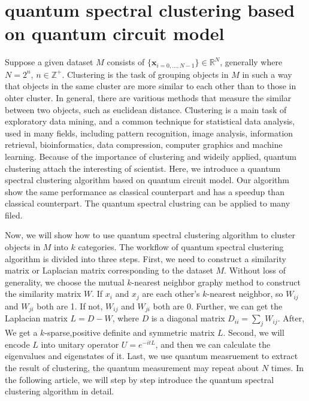 \documentclass[twocolumn,notitlepage]{revtex4-1}
\def\vec#1{{\bm #1}}
\begin{document}
\section{quantum spectral clustering based on quantum circuit model}
Suppose a given dataset $M$ consists of $\{\vec{x}_{i=0,\ldots,N-1}\}\in \mathbb{R}^{N}$, generally where $N=2^{n}$, $n \in \mathbb{Z}^{+}$.
Clustering is the task of grouping objects in $M$ in such a way that objects in the same cluster are more similar to each other than to those in ohter cluster.
In general, there are varitious methods that measure the similar between two objects, such as euclidean distance. 
Clustering is a main task of exploratory data mining, and a common technique for statistical data analysis, used in many fields, including pattern recognition, image analysis, information retrieval, bioinformatics, data compression, computer graphics and machine learning. 
Because of the importance of clustering and wideily applied, quantum clustering attach the interesting of scientist. 
Here, we introduce a quantum spectral clustering algorithm based on quantum circuit model. 
Our algorithm show the same performance as classical counterpart and has a speedup than classical counterpart. 
The quantum spectral clustring can be applied to many filed.

Now, we will show how to use quantum spectral clustering algorithm to cluster objects in $M$ into $k$ categories.
The workflow of quantum spectral clustering algorithm is divided into three steps. 
First, we need to construct a similarity matrix or Laplacian matrix corresponding to the dataset $M$. Without loss of generality, we choose the mutual $k$-nearest neighbor graphy method to construct the similarity matrix $W$.
If $x_i$ and $x_j$ are each other's $k$-nearest neighbor, so $W_{ij}$ and $W_{ji}$ both are 1. 
If not, $W_{ij}$ and $W_{ji}$ both are 0. 
Further, we can get the Laplacian matrix $L=D-W$, where $D$ is a diagonal matrix $D_{ii}=\sum_{j}W_{ij}$. After, We get a $k$-sparse,positive definite and symmetric matrix $L$.
Second, we will encode $L$ into unitary operator $U=e^{-itL}$, and then we can calculate the eigenvalues and eigenstates of it.
Last, we use quantum measruement to extract the result of clustering, the quantum measurement may repeat about $N$ times.
In the following article, we will step by step introduce the quantum spectral clustering algorithm in detail. 
\end{document}
